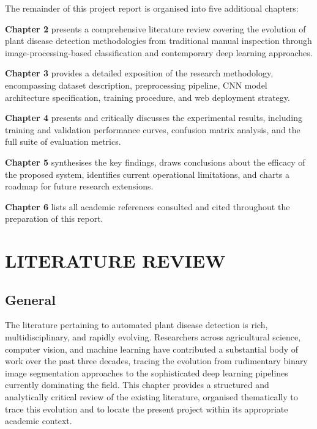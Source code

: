 \documentclass[12pt,a4paper]{report}
\begin{document}
The remainder of this project report is organised into five additional chapters:

\textbf{Chapter 2} presents a comprehensive literature review covering the evolution of plant disease detection methodologies from traditional manual inspection through image-processing-based classification and contemporary deep learning approaches.

\textbf{Chapter 3} provides a detailed exposition of the research methodology, encompassing dataset description, preprocessing pipeline, CNN model architecture specification, training procedure, and web deployment strategy.

\textbf{Chapter 4} presents and critically discusses the experimental results, including training and validation performance curves, confusion matrix analysis, and the full suite of evaluation metrics.

\textbf{Chapter 5} synthesises the key findings, draws conclusions about the efficacy of the proposed system, identifies current operational limitations, and charts a roadmap for future research extensions.

\textbf{Chapter 6} lists all academic references consulted and cited throughout the preparation of this report.

\chapter{LITERATURE REVIEW}

\section{General}

The literature pertaining to automated plant disease detection is rich, multidisciplinary, and rapidly evolving. Researchers across agricultural science, computer vision, and machine learning have contributed a substantial body of work over the past three decades, tracing the evolution from rudimentary binary image segmentation approaches to the sophisticated deep learning pipelines currently dominating the field. This chapter provides a structured and analytically critical review of the existing literature, organised thematically to trace this evolution and to locate the present project within its appropriate academic context.
\end{document}
